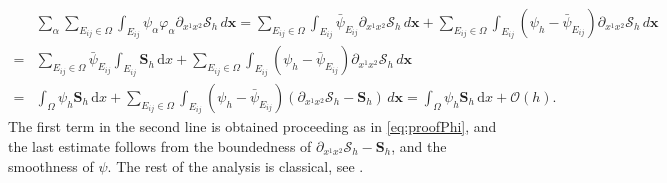 \documentclass[a4paper,10pt]{article}
\begin{document}
$$
\begin{aligned}
&\sum_{\alpha}\sum_{E_{ij}\in\Omega} \int_{E_{ij}} \psi_{\alpha}\varphi_{\alpha} \partial_{x^1x^2}\mathcal{S}_{h}\,d\mathbf{x} =
\sum_{E_{ij}\in\Omega} \int_{E_{ij}} \bar\psi_{E_{ij}} \partial_{x^1x^2}\mathcal{S}_{h}\,d\mathbf{x} 
+  \sum_{E_{ij}\in\Omega} \int_{E_{ij}} (\psi_h - \bar\psi_{E_{ij}}   ) \partial_{x^1x^2}\mathcal{S}_{h}\,d\mathbf{x}\\
= & \sum_{E_{ij}\in\Omega} \bar\psi_{E_{ij}} \int_{E_{ij}}\mathbf{S}_h\,\mathrm{d}x +   \sum_{E_{ij}\in\Omega} \int_{E_{ij}} (\psi_h - \bar\psi_{E_{ij}})   \partial_{x^1x^2}\mathcal{S}_{h}\,d\mathbf{x}\\
= &    \int_{\Omega} \psi_ h\mathbf{S}_h\,\mathrm{d}x 
 + \sum_{E_{ij}\in\Omega} \int_{E_{ij}} (\psi_h - \bar\psi_{E_{ij}})   (\partial_{x^1x^2}\mathcal{S}_{h}-\mathbf{S}_h)\,d\mathbf{x}   =
 \int_{\Omega} \psi_ h\mathbf{S}_h\,\mathrm{d}x  + \mathcal{O}(h).
\end{aligned}
$$
The first term in the second line is obtained proceeding as in  \eqref{eq:proofPhi}, and the last  estimate follows from the boundedness of $\partial_{x^1x^2}\mathcal{S}_{h}-\mathbf{S}_h$,
and the smoothness of $\psi$. The rest of the analysis is classical, see     \cite{herbin23,amr2025}.
 
\end{document}
